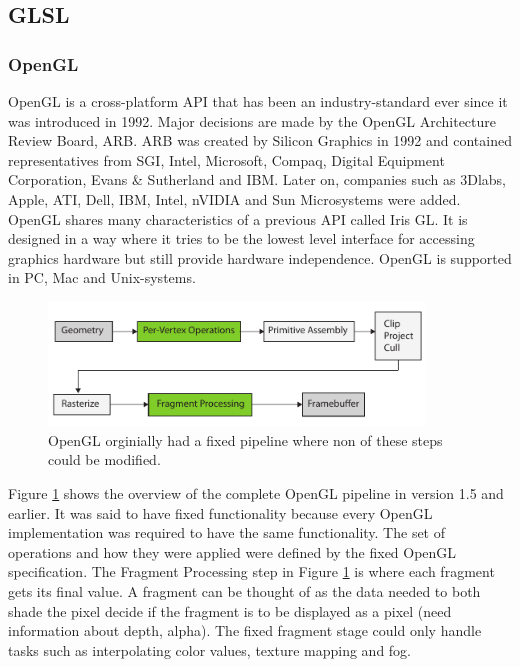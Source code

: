\subsection{GLSL}

\subsubsection{OpenGL}

OpenGL is a cross-platform API that has been an industry-standard ever since it was introduced in 1992. Major decisions are made by the OpenGL Architecture Review Board, ARB. ARB was created by Silicon Graphics in 1992 and contained representatives from SGI, Intel, Microsoft, Compaq, Digital Equipment Corporation, Evans \& Sutherland and IBM. Later on, companies such as 3Dlabs, Apple, ATI, Dell, IBM, Intel, nVIDIA and Sun Microsystems were added. OpenGL shares many characteristics of a previous API called Iris GL. It is designed in a way where it tries to be the lowest level interface for accessing graphics hardware but still provide hardware independence. OpenGL is supported in PC, Mac and Unix-systems.

\begin{figure}[ht!]
\centering
\includegraphics[width=100mm]{img/glpipeline.pdf}
\caption{OpenGL orginially had a fixed pipeline where non of these steps could be modified.}
\label{glfixed}
\end{figure}

Figure \ref{glfixed} shows the overview of the complete OpenGL pipeline in version 1.5 and earlier. It was said to have fixed functionality because every OpenGL implementation was required to have the same functionality. The set of operations and how they were applied were defined by the fixed OpenGL specification. The Fragment Processing step in Figure \ref{glfixed} is where each fragment gets its final value. A fragment can be thought of as the data needed to both shade the pixel decide if the fragment is to be displayed as a pixel (need information about depth, alpha). The fixed fragment stage could only handle tasks such as interpolating color values, texture mapping and fog. 

